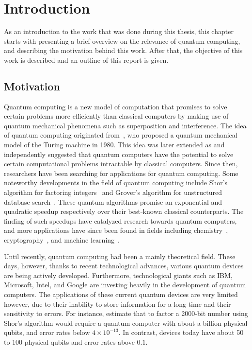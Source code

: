 \chapter{Introduction}
As an introduction to the work that was done during this thesis, this chapter starts with presenting a brief overview on the relevance of quantum computing, and describing the motivation behind this work.
After that, the objective of this work is described and an outline of this report is given.

\section{Motivation}
Quantum computing is a new model of computation that promises to solve certain problems more efficiently than classical computers by making use of quantum mechanical phenomena such as superposition and interference.
The idea of quantum computing originated from~\textcite{benioff1980computer}, who proposed a quantum mechanical model of the Turing machine in 1980.
This idea was later extended as \textcite{manin1980vychislimoe} and \textcite{feynman1982simulating} independently suggested that quantum computers have the potential to solve certain computational problems intractable by classical computers.
Since then, researchers have been searching for applications for quantum computing.
Some noteworthy developments in the field of quantum computing include Shor's algorithm for factoring integers~\cite{shor1999polynomial} and Grover's algorithm for unstructured database search~\cite{grover1996fast}.
These quantum algorithms promise an exponential and quadratic speedup respectively over their best-known classical counterparts.
The finding of such speedups have catalyzed research towards quantum computers, and more applications have since been found in fields including chemistry~\cite{mcardle2018quantum}, cryptography~\cite{bennett2014quantum}, and machine learning~\cite{biamonte2017quantum}.

Until recently, quantum computing had been a mainly theoretical field.
These days, however, thanks to recent technological advances, various quantum devices are being actively developed.
Furthermore, technological giants such as IBM, Microsoft, Intel, and Google are investing heavily in the development of quantum computers.
The applications of these current quantum devices are very limited however, due to their inability to store information for a long time and their sensitivity to errors.
For instance, \textcite[Appendix~M]{fowler2012surface} estimate that to factor a 2000-bit number using Shor's algorithm would require a quantum computer with about a billion physical qubits, and error rates below $4 \times 10^{-13}$.
In contrast, devices today have about 50 to 100 physical qubits and error rates above $0.1$.

